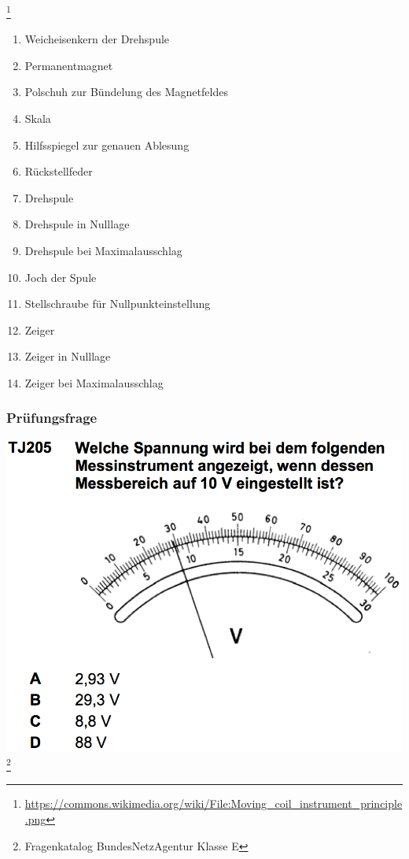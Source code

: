 \begin{frame}
	        \footnote{\tiny \url{https://commons.wikimedia.org/wiki/File:Moving_coil_instrument_principle.png}}
	\begin{minipage}{0.65\textwidth}
	\begin{enumerate} \footnotesize
		\item  Weicheisenkern der Drehspule
		\item  Permanentmagnet
		\item  Polschuh zur Bündelung des Magnetfeldes
		\item  Skala
		\item  Hilfsspiegel zur genauen Ablesung
		\item  Rückstellfeder
		\item  Drehspule
		\item  Drehspule in Nulllage
		\item  Drehspule bei Maximalausschlag
		\item  Joch der Spule
		\item  Stellschraube für Nullpunkteinstellung
		\item  Zeiger
		\item  Zeiger in Nulllage
		\item  Zeiger bei Maximalausschlag
	\end{enumerate}
	\end{minipage}
\end{frame}

\begin{frame}
    \frametitle{Prüfungsfrage}
    \begin{center}
        \includegraphics[width=.95\textwidth,height=.8\textheight,keepaspectratio]{e17/messbereich.png}
        \footnote{\tiny Fragenkatalog BundesNetzAgentur Klasse E}
	\end{center}
\end{frame}

